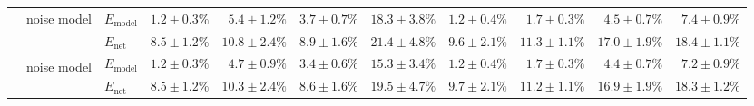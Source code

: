 \begin{sidewaystable}
\begin{tabular}{p{2.2cm} p{1.7cm} l r r r r r r r r }
	\\\cmidrule(l){2-11}
	&
	\multirow{2}{1.7cm}{\raggedleft %
	noise model} &
	$E_\mathrm{model}$ & 
	\color{Gray}$1.2 \pm 0.3\%$ & \color{Gray}$5.4 \pm 1.2\%$ & \color{Gray}$3.7 \pm 0.7\%$ & \color{Gray}$18.3 \pm 3.8\%$ & \color{Gray}$1.2 \pm 0.4\%$ & \color{Gray}$1.7 \pm 0.3\%$ & \color{Gray}$4.5 \pm 0.7\%$ & \color{Gray}$7.4 \pm 0.9\%$
	\\
	& & 
	$E_\mathrm{net}$ &
	\cellcolor{White!13!SteelBlue}$8.5 \pm 1.2\%$ & \cellcolor{White!19!SteelBlue}$10.8 \pm 2.4\%$ & \cellcolor{White!19!SteelBlue}$8.9 \pm 1.6\%$ & \cellcolor{White!32!SteelBlue}$21.4 \pm 4.8\%$ & \cellcolor{White!25!SteelBlue}$9.6 \pm 2.1\%$ & \cellcolor{White!7!SteelBlue}$11.3 \pm 1.1\%$ & \cellcolor{White!7!SteelBlue}$17.0 \pm 1.9\%$ & \cellcolor{White!7!SteelBlue}$18.4 \pm 1.1\%$
	\\\cmidrule(l){2-11}
	&
	\multirow{2}{1.7cm}{\raggedleft %
	noise model\textsuperscript{\dag}} &
	$E_\mathrm{model}$ & 
	\color{Gray}$1.2 \pm 0.3\%$ & \color{Gray}$4.7 \pm 0.9\%$ & \color{Gray}$3.4 \pm 0.6\%$ & \color{Gray}$15.3 \pm 3.4\%$ & \color{Gray}$1.2 \pm 0.4\%$ & \color{Gray}$1.7 \pm 0.3\%$ & \color{Gray}$4.4 \pm 0.7\%$ & \color{Gray}$7.2 \pm 0.9\%$
	\\
	& & 
	$E_\mathrm{net}$ &
	\cellcolor{White!7!SteelBlue}$8.5 \pm 1.2\%$ & \cellcolor{White!32!SteelBlue}$10.3 \pm 2.4\%$ & \cellcolor{White!25!SteelBlue}$8.6 \pm 1.6\%$ & \cellcolor{White!50!SteelBlue}$19.5 \pm 4.7\%$ & \cellcolor{White!19!SteelBlue}$9.7 \pm 2.1\%$ & \cellcolor{White!13!SteelBlue}$11.2 \pm 1.1\%$ & \cellcolor{White!13!SteelBlue}$16.9 \pm 1.9\%$ & \cellcolor{White!13!SteelBlue}$18.3 \pm 1.2\%$
	\\
	\bottomrule
	\end{tabular}
\end{sidewaystable}

